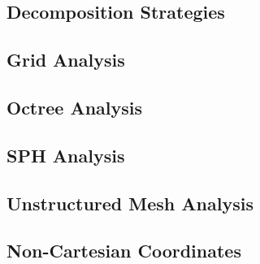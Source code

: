 \subsection{Decomposition Strategies}

\subsection{Grid Analysis}

\subsection{Octree Analysis}

\subsection{SPH Analysis}

\subsection{Unstructured Mesh Analysis}

\subsection{Non-Cartesian Coordinates}


